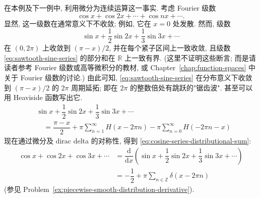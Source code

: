 \begin{Example}
\label{ex:fourier-series-distribution}
在本例及下一例中, 利用微分为连续运算这一事实. 考虑 Fourier 级数
\begin{equation}\label{eq:cosine-series-distributional-sum}
\cos x+\cos2x+\cdots+\cos nx+\cdots.
\end{equation}
显然, 这一级数在通常意义下不收敛; 例如, 它在 $x=0$ 处发散. 然而, 级数
\begin{equation}\label{eq:sawtooth-sine-series}
\sin x+\dfrac12\sin2x+\dfrac13\sin3x+\cdots
\end{equation}
在 $(0,2\pi)$ 上收敛到 $(\pi-x)/2$, 并在每个紧子区间上一致收敛, 且级数 \eqref{eq:sawtooth-sine-series} 的部分和在 $\mathbb{R}$ 上一致有界. (这里不证明这些断言; 而是请读者参考 Fourier 级数或高等微积分的教材, 或 Chapter~\ref{chap:function-spaces} 中关于 Fourier 级数的讨论.) 由此可知, \eqref{eq:sawtooth-sine-series} 在分布意义下收敛到 $(\pi-x)/2$ 的 $2\pi$ 周期延拓; 即在 $2\pi$ 的整数倍处有跳跃的"锯齿波". 甚至可以用 Heaviside 函数写出它.\[
\begin{aligned}
&\sin x+\dfrac12\sin2x+\dfrac13\sin3x+\cdots\\
&\quad=\dfrac{\pi-x}2+\pi\sum_{n=1}^\infty H(x-2\pi n)-\pi\sum_{n=0}^\infty H(-2\pi n-x)
\end{aligned}
\]现在通过微分及 dirac delta 的对称性, 得到 \eqref{eq:cosine-series-distributional-sum}:
\begin{equation}\label{eq:cosine-series-dirac-comb}
\begin{aligned}
\cos x+\cos2x+\cos3x+\cdots
&=\dfrac{\mathrm{d}}{\mathrm{d}x}\left(\sin x+\dfrac12\sin2x+\dfrac13\sin3x+\cdots\right)\\
&=-\dfrac12+\pi\sum_{n\in\mathbb{Z}}\delta(x-2\pi n)
\end{aligned}
\end{equation}
(参见 Problem~\ref{ex:piecewise-smooth-distribution-derivative}).
\end{Example}

